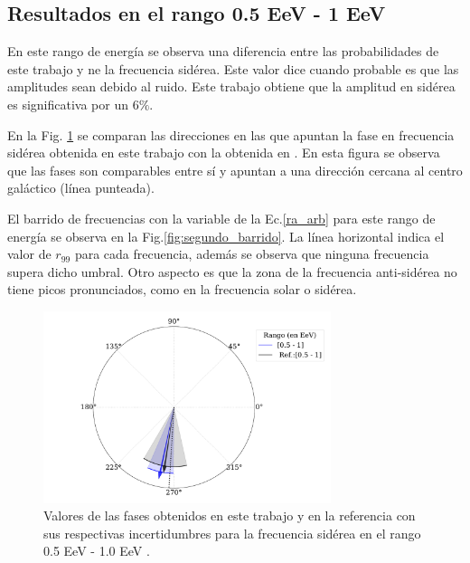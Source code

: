 \subsection{Resultados en el rango 0.5 EeV - 1 EeV}
En este rango de energía se observa una diferencia entre las probabilidades de este trabajo y \cite{Aab_2020}  ne la frecuencia sidérea. Este valor dice cuando probable es que las amplitudes sean debido al ruido. Este trabajo obtiene que la amplitud en sidérea es significativa por un  $6\%$.  

En la Fig. \ref{fig:segundo} se comparan las direcciones en las que apuntan la fase en frecuencia sidérea obtenida en este trabajo con la obtenida en \cite{Aab_2020}. En esta figura se observa que las fases son comparables entre sí y apuntan a una dirección cercana al centro galáctico (línea punteada).

El barrido de frecuencias con la variable de la Ec.\ref{ra_arb} para este rango de energía se observa en la Fig.\ref{fig:segundo_barrido}. La línea horizontal indica el valor de $r_{99}$ para cada frecuencia, además se observa que ninguna frecuencia supera dicho umbral. Otro aspecto es que la zona de la frecuencia anti-sidérea no tiene picos pronunciados, como en la frecuencia solar o sidérea.

\begin{figure}[H]
    \begin{small}
        \begin{center}
            \includegraphics[width=0.75\textwidth]{phase_segundo_bin.pdf}
        \end{center}
        \caption{Valores de las fases obtenidos en este trabajo y en la referencia con sus respectivas incertidumbres para la frecuencia sidérea en el  rango 0.5 EeV - 1.0 EeV .}
        \label{fig:segundo}
    \end{small}
\end{figure}

